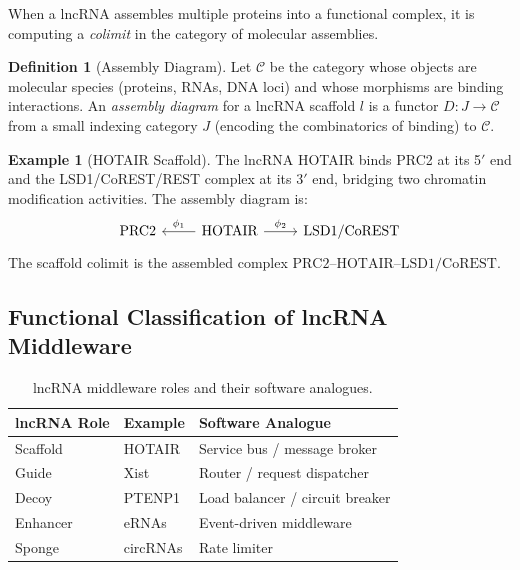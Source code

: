 \documentclass[12pt,a4paper]{article}
\theoremstyle{definition}
\newtheorem{definition}[theorem]{Definition}
\newtheorem{example}[theorem]{Example}
\begin{document}
When a lncRNA assembles multiple proteins into a functional complex, it
is computing a \emph{colimit} in the category of molecular assemblies.

\begin{definition}[Assembly Diagram]\label{def:assembly-diagram}
Let $\mathcal{C}$ be the category whose objects are molecular
species (proteins, RNAs, DNA loci) and whose morphisms are
binding interactions.  An \emph{assembly diagram} for a lncRNA scaffold
$l$ is a functor $D : J \to \mathcal{C}$ from a small indexing category
$J$ (encoding the combinatorics of binding) to $\mathcal{C}$.
\end{definition}

\begin{example}[HOTAIR Scaffold]
The lncRNA HOTAIR binds PRC2 at its 5\('\) end and the
LSD1/CoREST/REST complex at its 3\('\) end, bridging two chromatin
modification activities.  The assembly diagram is:
\[
\begin{tikzcd}
  \text{PRC2} & \text{HOTAIR} \arrow[l, "\phi_1"'] \arrow[r, "\phi_2"] &
  \text{LSD1/CoREST}
\end{tikzcd}
\]
The scaffold colimit is the assembled complex
$\text{PRC2--HOTAIR--LSD1/CoREST}$.
\end{example}

\subsection{Functional Classification of lncRNA Middleware}

\begin{table}[H]
\centering
\caption{lncRNA middleware roles and their software analogues.}
\label{tab:lncrna-roles}
\begin{tabular}{@{}lll@{}}
\toprule
\textbf{lncRNA Role} & \textbf{Example} & \textbf{Software Analogue} \\
\midrule
Scaffold   & HOTAIR  & Service bus / message broker \\
Guide      & Xist    & Router / request dispatcher \\
Decoy      & PTENP1  & Load balancer / circuit breaker \\
Enhancer   & eRNAs   & Event-driven middleware \\
Sponge     & circRNAs & Rate limiter \\
\bottomrule
\end{tabular}
\end{table}

\end{document}
